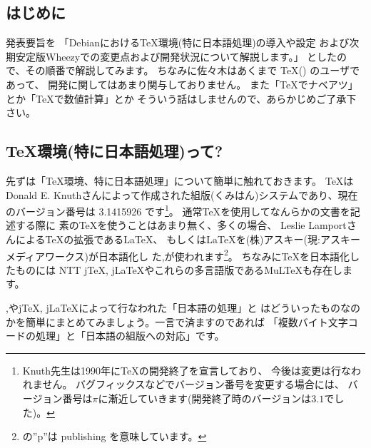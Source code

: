 \documentclass[mingoth,a4paper]{jsarticle}
\begin{document}
\label{sec:TeXLive2011}

\subsection{はじめに}

発表要旨を
「Debianにおける{\TeX}環境(特に日本語処理)の導入や設定
および次期安定版Wheezyでの変更点および開発状況について解説します。」
としたので、その順番で解説してみます。
%
ちなみに佐々木はあくまで {\TeX}({\pLaTeX}) のユーザであって、
開発に関してはあまり関与しておりません。
%
また「{\TeX}でナベアツ」とか「{\TeX}で数値計算」とか
そういう話はしませんので、あらかじめご了承下さい。

\subsection{{\TeX}環境(特に日本語処理)って?}
\label{subsec:history}


先ずは「{\TeX}環境、特に日本語処理」について簡単に触れておきます。
%
{\TeX}はDonald E. Knuthさんによって作成された組版(くみはん)システムであり、現在のバージョン番号は 3.1415926 です\footnote{%
  Knuth先生は1990年に{\TeX}の開発終了を宣言しており、
  今後は変更は行なわれません。
  バグフィックスなどでバージョン番号を変更する場合には、
  バージョン番号は$\pi$に漸近していきます(開発終了時のバージョンは$3.1$でした)。
}。
%
通常{\TeX}を使用してなんらかの文書を記述する際に
素の{\TeX}を使うことはあまり無く、多くの場合、
Leslie Lamportさんによる{\TeX}の拡張である{\LaTeX}、
もしくは{\LaTeX}を(株)アスキー(現:アスキーメディアワークス)が日本語化し
た{\pTeX},{\pLaTeX}が使われます\footnote{%
  {\pLaTeX}の''p''は publishing を意味しています。
}。
ちなみに{\TeX}を日本語化したものには
NTT j{\TeX}, j{\LaTeX}やこれらの多言語版である{MuL\TeX}も存在します。

{\pTeX},{\pLaTeX}やj{\TeX}, j{\LaTeX}によって行なわれた「日本語の処理」と
はどういったものなのかを簡単にまとめてみましょう。一言で済ますのであれば
「複数バイト文字コードの処理」と「日本語の組版への対応」です。
\end{document}
